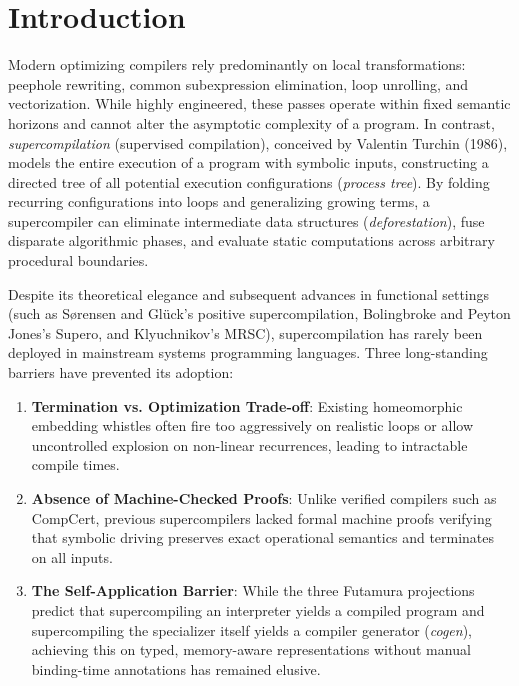 \documentclass[10pt,twocolumn]{article}
\begin{document}
\section{Introduction}
Modern optimizing compilers rely predominantly on local transformations: peephole rewriting, common subexpression elimination, loop unrolling, and vectorization. While highly engineered, these passes operate within fixed semantic horizons and cannot alter the asymptotic complexity of a program. In contrast, \textit{supercompilation} (supervised compilation), conceived by Valentin Turchin (1986), models the entire execution of a program with symbolic inputs, constructing a directed tree of all potential execution configurations (\textit{process tree}). By folding recurring configurations into loops and generalizing growing terms, a supercompiler can eliminate intermediate data structures (\textit{deforestation}), fuse disparate algorithmic phases, and evaluate static computations across arbitrary procedural boundaries.

Despite its theoretical elegance and subsequent advances in functional settings (such as S{\o}rensen and Gl{\"u}ck's positive supercompilation, Bolingbroke and Peyton Jones's Supero, and Klyuchnikov's MRSC), supercompilation has rarely been deployed in mainstream systems programming languages. Three long-standing barriers have prevented its adoption:
\begin{enumerate}
    \item \textbf{Termination vs. Optimization Trade-off}: Existing homeomorphic embedding whistles often fire too aggressively on realistic loops or allow uncontrolled explosion on non-linear recurrences, leading to intractable compile times.
    \item \textbf{Absence of Machine-Checked Proofs}: Unlike verified compilers such as CompCert, previous supercompilers lacked formal machine proofs verifying that symbolic driving preserves exact operational semantics and terminates on all inputs.
    \item \textbf{The Self-Application Barrier}: While the three Futamura projections predict that supercompiling an interpreter yields a compiled program and supercompiling the specializer itself yields a compiler generator (\textit{cogen}), achieving this on typed, memory-aware representations without manual binding-time annotations has remained elusive.
\end{enumerate}
\end{document}
